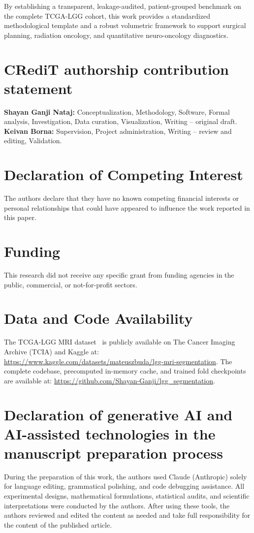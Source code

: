 \documentclass[preprint,3p,times,onecolumn]{elsarticle}
\begin{document}
By establishing a transparent, leakage-audited, patient-grouped benchmark on the complete TCGA-LGG cohort, this work provides a standardized methodological template and a robust volumetric framework to support surgical planning, radiation oncology, and quantitative neuro-oncology diagnostics.

\section*{CRediT authorship contribution statement}
\textbf{Shayan Ganji Nataj:} Conceptualization, Methodology, Software, Formal analysis, Investigation, Data curation, Visualization, Writing -- original draft. \textbf{Keivan Borna:} Supervision, Project administration, Writing -- review and editing, Validation.

\section*{Declaration of Competing Interest}
The authors declare that they have no known competing financial interests or personal relationships that could have appeared to influence the work reported in this paper.

\section*{Funding}
This research did not receive any specific grant from funding agencies in the public, commercial, or not-for-profit sectors.

\section*{Data and Code Availability}
The TCGA-LGG MRI dataset~\cite{buda2019association} is publicly available on The Cancer Imaging Archive (TCIA) and Kaggle at: \href{https://www.kaggle.com/datasets/mateuszbuda/lgg-mri-segmentation}{\url{https://www.kaggle.com/datasets/mateuszbuda/lgg-mri-segmentation}}. The complete codebase, precomputed in-memory cache, and trained fold checkpoints are available at: \href{https://github.com/Shayan-Ganji/lgg_segmentation}{\url{https://github.com/Shayan-Ganji/lgg_segmentation}}.

\section*{Declaration of generative AI and AI-assisted technologies in the manuscript preparation process}
During the preparation of this work, the authors used Claude (Anthropic) solely for language editing, grammatical polishing, and code debugging assistance. All experimental designs, mathematical formulations, statistical audits, and scientific interpretations were conducted by the authors. After using these tools, the authors reviewed and edited the content as needed and take full responsibility for the content of the published article.



\end{document}

